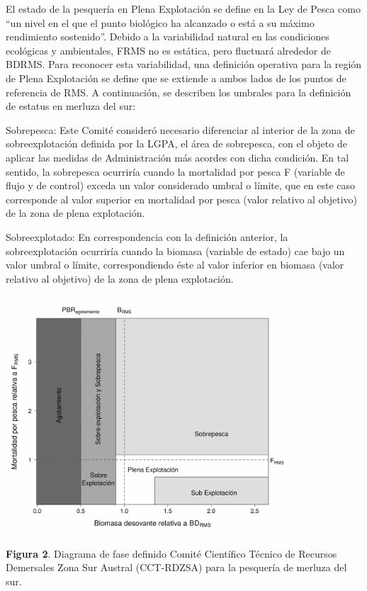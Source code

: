 \documentclass[
  spanish,
]{article}
\begin{document}
El estado de la pesquería en Plena Explotación se define en la Ley de
Pesca como ``un nivel en el que el punto biológico ha alcanzado o está a
su máximo rendimiento sostenido''. Debido a la variabilidad natural en
las condiciones ecológicas y ambientales, FRMS no es estática, pero
fluctuará alrededor de BDRMS. Para reconocer esta variabilidad, una
definición operativa para la región de Plena Explotación se define que
se extiende a ambos lados de los puntos de referencia de RMS. A
continuación, se describen los umbrales para la definición de estatus en
merluza del sur:

Sobrepesca: Este Comité consideró necesario diferenciar al interior de
la zona de sobreexplotación definida por la LGPA, el área de sobrepesca,
con el objeto de aplicar las medidas de Administración más acordes con
dicha condición. En tal sentido, la sobrepesca ocurriría cuando la
mortalidad por pesca F (variable de flujo y de control) exceda un valor
considerado umbral o límite, que en este caso corresponde al valor
superior en mortalidad por pesca (valor relativo al objetivo) de la zona
de plena explotación.

Sobreexplotado: En correspondencia con la definición anterior, la
sobreexplotación ocurriría cuando la biomasa (variable de estado) cae
bajo un valor umbral o límite, correspondiendo éste al valor inferior en
biomasa (valor relativo al objetivo) de la zona de plena explotación.

\begin{center}
\includegraphics[width=0.8\textwidth]{Figuras/Figura_2.png}
\end{center}

\small \textbf{Figura 2}. Diagrama de fase definido Comité Científico
Técnico de Recursos Demersales Zona Sur Austral (CCT-RDZSA) para la
pesquería de merluza del sur. \vspace{0.5cm} \normalsize
\end{document}

